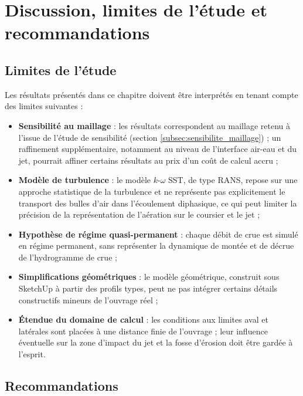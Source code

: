 \section{Discussion, limites de l'étude et recommandations}
\label{sec:discussion_limites_recommandations}

\subsection{Limites de l'étude}
\label{subsec:limites_etude}

Les résultats présentés dans ce chapitre doivent être interprétés en tenant compte des limites suivantes :
\begin{itemize}
    \item \textbf{Sensibilité au maillage} : les résultats correspondent au maillage retenu à l'issue de l'étude de sensibilité (section \ref{subsec:sensibilite_maillage}) ; un raffinement supplémentaire, notamment au niveau de l'interface air-eau et du jet, pourrait affiner certains résultats au prix d'un coût de calcul accru ;
    \item \textbf{Modèle de turbulence} : le modèle $k$-$\omega$ SST, de type RANS, repose sur une approche statistique de la turbulence et ne représente pas explicitement le transport des bulles d'air dans l'écoulement diphasique, ce qui peut limiter la précision de la représentation de l'aération sur le coursier et le jet ;
    \item \textbf{Hypothèse de régime quasi-permanent} : chaque débit de crue est simulé en régime permanent, sans représenter la dynamique de montée et de décrue de l'hydrogramme de crue ;
    \item \textbf{Simplifications géométriques} : le modèle géométrique, construit sous SketchUp à partir des profils types, peut ne pas intégrer certains détails constructifs mineurs de l'ouvrage réel ;
    \item \textbf{Étendue du domaine de calcul} : les conditions aux limites aval et latérales sont placées à une distance finie de l'ouvrage ; leur influence éventuelle sur la zone d'impact du jet et la fosse d'érosion doit être gardée à l'esprit.
\end{itemize}

\subsection{Recommandations}
\label{subsec:recommandations}

